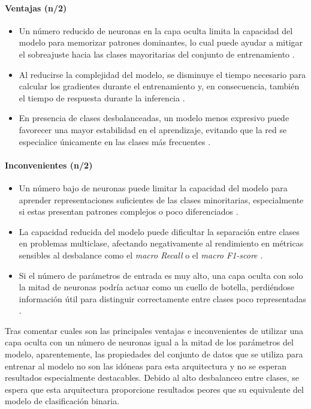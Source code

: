 \paragraph{Ventajas (n/2)}
\begin{itemize}
	\item Un número reducido de neuronas en la capa oculta limita la capacidad del modelo para memorizar patrones dominantes, lo cual puede ayudar a mitigar el sobreajuste hacia las clases mayoritarias del conjunto de entrenamiento \cite{zhang2016understanding}.
	\item Al reducirse la complejidad del modelo, se disminuye el tiempo necesario para calcular los gradientes durante el entrenamiento y, en consecuencia, también el tiempo de respuesta durante la inferencia \cite{han2015learning}.
	\item En presencia de clases desbalanceadas, un modelo menos expresivo puede favorecer una mayor estabilidad en el aprendizaje, evitando que la red se especialice únicamente en las clases más frecuentes \cite{he2009learning}.

\end{itemize}
\paragraph{Inconvenientes (n/2)}
\begin{itemize}
	\item Un número bajo de neuronas puede limitar la capacidad del modelo para aprender representaciones suficientes de las clases minoritarias, especialmente si estas presentan patrones complejos o poco diferenciados \cite{chawla2004editorial}.
	\item La capacidad reducida del modelo puede dificultar la separación entre clases en problemas multiclase, afectando negativamente al rendimiento en métricas sensibles al desbalance como el \textit{macro Recall} o el \textit{macro F1-score} \cite{he2009learning}.
	\item Si el número de parámetros de entrada es muy alto, una capa oculta con solo la mitad de neuronas podría actuar como un cuello de botella, perdiéndose información útil para distinguir correctamente entre clases poco representadas \cite{goodfellow2016deep}.

\end{itemize}

Tras comentar cuales son las principales ventajas e inconvenientes de utilizar una capa oculta con un número de neuronas igual a la mitad de los parámetros del modelo, aparentemente, las propiedades del conjunto de datos que se utiliza para entrenar al modelo no son las idóneas para esta arquitectura y no se esperan resultados especialmente destacables. Debido al alto desbalanceo entre clases, se espera que esta arquitectura proporcione resultados peores que su equivalente del modelo de clasificación binaria.

